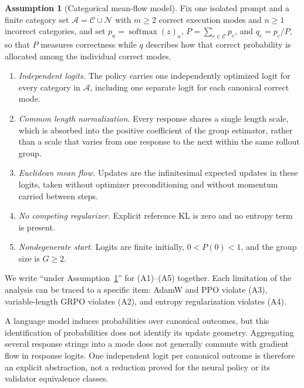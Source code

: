 \documentclass{article}
\newcommand{\1}{\mathbf 1}
\theoremstyle{remark}
\theoremstyle{definition}
\newtheorem{assumption}[lemma]{Assumption}
\theoremstyle{plain}
\begin{document}
\begin{assumption}[Categorical mean-flow model]
\label{ass:categorical-mean-flow}
Fix one isolated prompt and a finite category set
$\mathcal A=\mathcal C\mathbin{\dot\cup}\mathcal N$ with $m\ge2$ correct
execution modes and $n\ge1$ incorrect categories, and set
$p_a=\operatorname{softmax}(z)_a$, $P=\sum_{c\in\mathcal C}p_c$, and
$q_c=p_c/P$, so that $P$ measures correctness while $q$ describes how that
correct probability is allocated among the individual correct modes.
\begin{enumerate}
\item[(A1)] \emph{Independent logits.} The policy carries one independently
  optimized logit for every category in $\mathcal A$, including one separate
  logit for each canonical correct mode.
\item[(A2)] \emph{Common length normalization.} Every response shares a single
  length scale, which is absorbed into the positive coefficient of the group
  estimator, rather than a scale that varies from one response to the next
  within the same rollout group.
\item[(A3)] \emph{Euclidean mean flow.} Updates are the infinitesimal expected
  updates in these logits, taken without optimizer preconditioning and without
  momentum carried between steps.
\item[(A4)] \emph{No competing regularizer.} Explicit reference KL is zero and
  no entropy term is present.
\item[(A5)] \emph{Nondegenerate start.} Logits are finite initially,
  $0<P(0)<1$, and the group size is $G\ge2$.
\end{enumerate}
\end{assumption}

We write ``under Assumption~\ref{ass:categorical-mean-flow}'' for (A1)--(A5)
together. Each limitation of the analysis can be traced to a specific item:
AdamW and PPO violate (A3), variable-length GRPO violates (A2), and entropy
regularization violates (A4).

A language model induces probabilities over canonical outcomes, but this
identification of probabilities does not identify its update geometry.
Aggregating several response strings into a mode does not generally commute
with gradient flow in response logits. One independent logit per canonical
outcome is therefore an explicit abstraction, not a reduction proved for the
neural policy or its validator equivalence classes.
\end{document}
